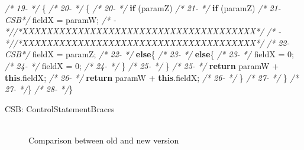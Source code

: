 \documentclass[
]{article}
\newenvironment{Shaded}{\begin{snugshade}}{\end{snugshade}}
\newcommand{\CommentTok}[1]{\textcolor[rgb]{0.56,0.35,0.01}{\textit{#1}}}
\newcommand{\DecValTok}[1]{\textcolor[rgb]{0.00,0.00,0.81}{#1}}
\newcommand{\FunctionTok}[1]{\textcolor[rgb]{0.00,0.00,0.00}{#1}}
\newcommand{\KeywordTok}[1]{\textcolor[rgb]{0.13,0.29,0.53}{\textbf{#1}}}
\newcommand{\NormalTok}[1]{#1}
\begin{document}
\begin{landscape}
\begin{Shaded}
\begin{Highlighting}[]
\CommentTok{/* 19-   */}\NormalTok{    \{                                                    }\CommentTok{/* 20-   */}\NormalTok{    \{                                                    }
\CommentTok{/* 20-   */}        \KeywordTok{if}\NormalTok{ (paramZ)                                      }\CommentTok{/* 21-   */}        \KeywordTok{if}\NormalTok{ (paramZ)                                      }
\CommentTok{/* 21-CSB*/}\NormalTok{            fieldX = paramW;                             }\CommentTok{/*   -   *//*XXXXXXXXXXXXXXXXXXXXXXXXXXXXXXXXXXXXXX*/}               
\CommentTok{/*   -   *//*XXXXXXXXXXXXXXXXXXXXXXXXXXXXXXXXXXXXXX*/}               \CommentTok{/* 22-CSB*/}\NormalTok{            fieldX = paramZ;                             }
\CommentTok{/* 22-   */}        \KeywordTok{else}\NormalTok{\{                                            }\CommentTok{/* 23-   */}        \KeywordTok{else}\NormalTok{\{                                            }
\CommentTok{/* 23-   */}\NormalTok{            fieldX = }\DecValTok{0}\NormalTok{;                                  }\CommentTok{/* 24-   */}\NormalTok{            fieldX = }\DecValTok{0}\NormalTok{;                                  }
\CommentTok{/* 24-   */}\NormalTok{        \}                                                }\CommentTok{/* 25-   */}\NormalTok{        \}                                                }
\CommentTok{/* 25-   */}        \KeywordTok{return}\NormalTok{ paramW + }\KeywordTok{this}\NormalTok{.}\FunctionTok{fieldX}\NormalTok{;                     }\CommentTok{/* 26-   */}        \KeywordTok{return}\NormalTok{ paramW + }\KeywordTok{this}\NormalTok{.}\FunctionTok{fieldX}\NormalTok{;                     }
\CommentTok{/* 26-   */}\NormalTok{     \}                                                   }\CommentTok{/* 27-   */}\NormalTok{     \}                                                   }
\CommentTok{/* 27-   */}\NormalTok{\}                                                        }\CommentTok{/* 28-   */}\NormalTok{\}                                                        }


\NormalTok{CSB: ControlStatementBraces}
\end{Highlighting}
\end{Shaded}

\normalsize

\begin{figure}
\centering
\includegraphics{figures/fake.png}
\caption{Comparison between old and new version
\label{comparison_editing_line}}
\end{figure}

\end{landscape}
\end{document}
